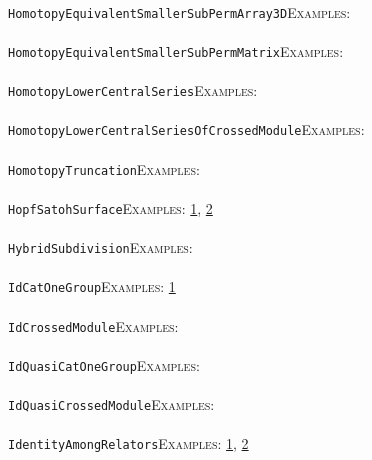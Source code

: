 \documentclass[a4paper,11pt]{report}
\begin{document}
{{ \\
 \texttt{HomotopyEquivalentSmallerSubPermArray3D}{\nobreakspace}{\nobreakspace}{\nobreakspace}{\nobreakspace}\textsc{Examples:} \\
 \\
 \texttt{HomotopyEquivalentSmallerSubPermMatrix}{\nobreakspace}{\nobreakspace}{\nobreakspace}{\nobreakspace}\textsc{Examples:} \\
 \\
 \texttt{HomotopyLowerCentralSeries}{\nobreakspace}{\nobreakspace}{\nobreakspace}{\nobreakspace}\textsc{Examples:} \\
 \\
 \texttt{HomotopyLowerCentralSeriesOfCrossedModule}{\nobreakspace}{\nobreakspace}{\nobreakspace}{\nobreakspace}\textsc{Examples:} \\
 \\
 \texttt{HomotopyTruncation}{\nobreakspace}{\nobreakspace}{\nobreakspace}{\nobreakspace}\textsc{Examples:} \\
 \\
 \texttt{HopfSatohSurface}{\nobreakspace}{\nobreakspace}{\nobreakspace}{\nobreakspace}\textsc{Examples:} \href{tutorial/chap3.html} {1}{\nobreakspace}, \href{../www/SideLinks/About/aboutCoverinSpaces.html} {2}{\nobreakspace} \\
 \\
 \texttt{HybridSubdivision}{\nobreakspace}{\nobreakspace}{\nobreakspace}{\nobreakspace}\textsc{Examples:} \\
 \\
 \texttt{IdCatOneGroup}{\nobreakspace}{\nobreakspace}{\nobreakspace}{\nobreakspace}\textsc{Examples:} \href{../www/SideLinks/About/aboutquasi.html} {1}{\nobreakspace} \\
 \\
 \texttt{IdCrossedModule}{\nobreakspace}{\nobreakspace}{\nobreakspace}{\nobreakspace}\textsc{Examples:} \\
 \\
 \texttt{IdQuasiCatOneGroup}{\nobreakspace}{\nobreakspace}{\nobreakspace}{\nobreakspace}\textsc{Examples:} \\
 \\
 \texttt{IdQuasiCrossedModule}{\nobreakspace}{\nobreakspace}{\nobreakspace}{\nobreakspace}\textsc{Examples:} \\
 \\
 \texttt{IdentityAmongRelators}{\nobreakspace}{\nobreakspace}{\nobreakspace}{\nobreakspace}\textsc{Examples:} \href{../www/SideLinks/About/aboutPeriodic.html} {1}{\nobreakspace}, \href{../www/SideLinks/About/aboutTopology.html} {2}{\nobreakspace} \\
}}
\end{document}
